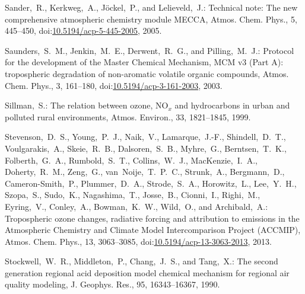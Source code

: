 \documentclass[acpd, online, hvmath]{copernicus}
\begin{document}
\begin{thebibliography}{47}
 Sander,~R., Kerkweg,~A., J\"{o}ckel,~P.,
  and Lelieveld,~J.: Technical note: The new comprehensive atmospheric
  chemistry module MECCA, Atmos. Chem. Phys., 5, 445--450,
  doi:\href{http://dx.doi.org/10.5194/acp-5-445-2005}{10.5194/acp-5-445-2005}, 2005.



 Saunders,~S.~M., Jenkin,~M.~E.,
  Derwent,~R.~G., and Pilling,~M.~J.: Protocol for the development of
  the Master Chemical Mechanism, MCM v3 (Part A): tropospheric
  degradation of non-aromatic volatile organic compounds,
  Atmos. Chem. Phys., 3, 161--180,
doi:\href{http://dx.doi.org/10.5194/acp-3-161-2003}{10.5194/acp-3-161-2003},
  2003.



 Sillman,~S.: {The relation
    between ozone, NO$_{x}$ and hydrocarbons in urban and polluted
    rural environments}, Atmos. Environ., 33, 1821--1845,
  1999.


 Stevenson,~D.~S.,
  Young,~P.~J., Naik,~V., Lamarque,~J.-F., Shindell,~D.~T.,
  Voulgarakis,~A., Skeie,~R.~B., Dalsoren,~S.~B., Myhre,~G.,
  Berntsen,~T.~K., Folberth,~G.~A., Rumbold,~S.~T., Collins,~W.~J.,
  MacKenzie,~I.~A., Doherty,~R.~M., Zeng,~G., van~Noije,~T.~P.~C.,
  Strunk,~A., Bergmann,~D., Cameron-Smith,~P., Plummer,~D.~A.,
  Strode,~S.~A., Horowitz,~L., Lee,~Y.~H., Szopa,~S., Sudo,~K.,
  Nagashima,~T., Josse,~B., Cionni,~I., Righi,~M., Eyring,~V.,
  Conley,~A., Bowman,~K.~W., Wild,~O., and Archibald,~A.: Tropospheric
  ozone changes, radiative forcing and attribution to emissions in the
  Atmospheric Chemistry and Climate Model Intercomparison Project
  (ACCMIP), Atmos. Chem. Phys., 13, 3063--3085,
  doi:\href{http://dx.doi.org/10.5194/acp-13-3063-2013}{10.5194/acp-13-3063-2013}, 2013.



 Stockwell,~W.~R., Middleton,~P.,
  Chang,~J.~S., and Tang,~X.: {The second generation regional acid
    deposition model chemical mechanism for regional air quality
    modeling}, J. Geophys. Res., 95, 16343--16367, 1990.



\end{thebibliography}
\end{document}
